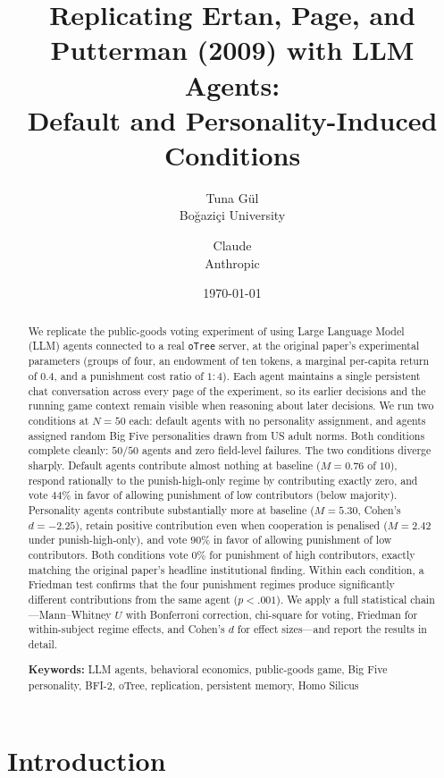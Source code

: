 \documentclass[12pt, a4paper]{article}
\title{Replicating Ertan, Page, and Putterman (2009) with LLM Agents:\\ Default and Personality-Induced Conditions}
\author{%
  Tuna G\"ul\\
  Bo\u{g}azi\c{c}i University
  \and
  Claude\\
  Anthropic
}
\date{\today}
\begin{document}
\maketitle

\begin{abstract}
We replicate the public-goods voting experiment of \citet{ertan2009who} using Large Language Model (LLM) agents connected to a real \texttt{oTree} server, at the original paper's experimental parameters (groups of four, an endowment of ten tokens, a marginal per-capita return of $0.4$, and a punishment cost ratio of $1{:}4$). Each agent maintains a single persistent chat conversation across every page of the experiment, so its earlier decisions and the running game context remain visible when reasoning about later decisions. We run two conditions at $N=50$ each: default agents with no personality assignment, and agents assigned random Big Five personalities drawn from US adult norms. Both conditions complete cleanly: $50/50$ agents and zero field-level failures. The two conditions diverge sharply. Default agents contribute almost nothing at baseline ($M=0.76$ of $10$), respond rationally to the punish-high-only regime by contributing exactly zero, and vote $44\%$ in favor of allowing punishment of low contributors (below majority). Personality agents contribute substantially more at baseline ($M=5.30$, Cohen's $d=-2.25$), retain positive contribution even when cooperation is penalised ($M=2.42$ under punish-high-only), and vote $90\%$ in favor of allowing punishment of low contributors. Both conditions vote $0\%$ for punishment of high contributors, exactly matching the original paper's headline institutional finding. Within each condition, a Friedman test confirms that the four punishment regimes produce significantly different contributions from the same agent ($p<.001$). We apply a full statistical chain---Mann--Whitney $U$ with Bonferroni correction, chi-square for voting, Friedman for within-subject regime effects, and Cohen's $d$ for effect sizes---and report the results in detail.

\medskip
\noindent\textbf{Keywords:} LLM agents, behavioral economics, public-goods game, Big Five personality, BFI-2, oTree, replication, persistent memory, Homo Silicus
\end{abstract}

\section{Introduction}
\end{document}

